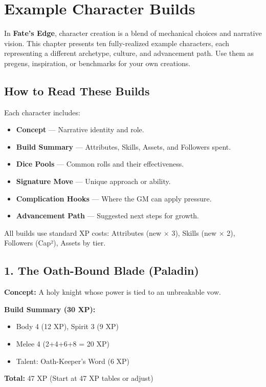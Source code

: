 
\chapter{Example Character Builds}

In \textbf{Fate's Edge}, character creation is a blend of mechanical choices and narrative vision. This chapter presents ten fully-realized example characters, each representing a different archetype, culture, and advancement path. Use them as pregens, inspiration, or benchmarks for your own creations.

\section{How to Read These Builds}

Each character includes:
\begin{itemize}
  \item \textbf{Concept} — Narrative identity and role.
  \item \textbf{Build Summary} — Attributes, Skills, Assets, and Followers spent.
  \item \textbf{Dice Pools} — Common rolls and their effectiveness.
  \item \textbf{Signature Move} — Unique approach or ability.
  \item \textbf{Complication Hooks} — Where the GM can apply pressure.
  \item \textbf{Advancement Path} — Suggested next steps for growth.
\end{itemize}

All builds use standard XP costs: Attributes (new × 3), Skills (new × 2), Followers (Cap²), Assets by tier.

\section{1. The Oath-Bound Blade (Paladin)}

\textbf{Concept:} A holy knight whose power is tied to an unbreakable vow.

\textbf{Build Summary (30 XP):}
\begin{itemize}
  \item Body 4 (12 XP), Spirit 3 (9 XP)
  \item Melee 4 (2+4+6+8 = 20 XP)
  \item Talent: Oath-Keeper's Word (6 XP)
\end{itemize}
\textbf{Total:} 47 XP (Start at 47 XP tables or adjust)

